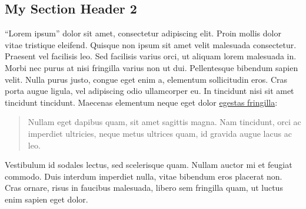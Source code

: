\documentclass[11pt,a4paper,oneside]{article}
\begin{document}
\hypertarget{my-section-header-2}{%
\subsection{My Section Header 2}\label{my-section-header-2}}

\enquote{Lorem ipsum} dolor sit amet, consectetur adipiscing elit. Proin
mollis dolor vitae tristique eleifend. Quisque non ipsum sit amet velit
malesuada consectetur. Praesent vel facilisis leo. Sed facilisis varius
orci, ut aliquam lorem malesuada in. Morbi nec purus at nisi fringilla
varius non ut dui. Pellentesque bibendum sapien velit. Nulla purus
justo, congue eget enim a, elementum sollicitudin eros. Cras porta augue
ligula, vel adipiscing odio ullamcorper eu. In tincidunt nisi sit amet
tincidunt tincidunt. Maecenas elementum neque eget dolor
\href{http://example.com}{egestas fringilla}:

\begin{quote}
Nullam eget dapibus quam, sit amet sagittis magna. Nam tincidunt, orci
ac imperdiet ultricies, neque metus ultrices quam, id gravida augue
lacus ac leo.
\end{quote}

Vestibulum id sodales lectus, sed scelerisque quam. Nullam auctor mi et
feugiat commodo. Duis interdum imperdiet nulla, vitae bibendum eros
placerat non. Cras ornare, risus in faucibus malesuada, libero sem
fringilla quam, ut luctus enim sapien eget dolor.
\end{document}
